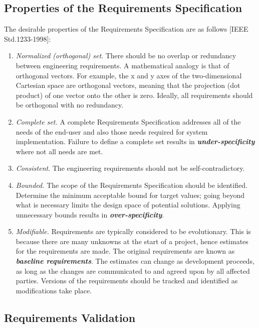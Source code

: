 \subsection{Properties of the Requirements Specification}
\label{subsection:properties-of-the-requirements-specification}

The desirable properties of the Requirements Specification are as
follows {[}IEEE Std.1233-1998{]}:

\begin{enumerate}
\def\labelenumi{\arabic{enumi})}
\item
  \emph{Normalized (orthogonal) set}. There should be no overlap or
  redundancy between engineering requirements. A mathematical analogy is
  that of orthogonal vectors. For example, the x and y axes of the
  two-dimensional Cartesian space are orthogonal vectors, meaning that
  the projection (dot product) of one vector onto the other is zero.
  Ideally, all requirements should be orthogonal with no redundancy.
\item
  \emph{Complete set.} A complete Requirements Specification addresses
  all of the needs of the end-user and also those needs required for
  system implementation. Failure to define a complete set results in
  \emph{\textbf{under-specificity}} where not all needs are met.
\item
  \emph{Consistent}. The engineering requirements should not be
  self-contradictory.
\item
  \emph{Bounded.} The scope of the Requirements Specification should be
  identified. Determine the minimum acceptable bound for target values;
  going beyond what is necessary limits the design space of potential
  solutions. Applying unnecessary bounds results in
  \emph{\textbf{over-specificity}}.
\item
  \emph{Modifiable.} Requirements are typically considered to be
  evolutionary. This is because there are many unknowns at the start of
  a project, hence estimates for the requirements are made. The original
  requirements are known as \emph{\textbf{baseline requirements}}. The
  estimates can change as development proceeds, as long as the changes
  are communicated to and agreed upon by all affected parties. Versions
  of the requirements should be tracked and identified as modifications
  take place.
\end{enumerate}

\subsection{Requirements Validation}
\label{subsection:requirements-validation}

